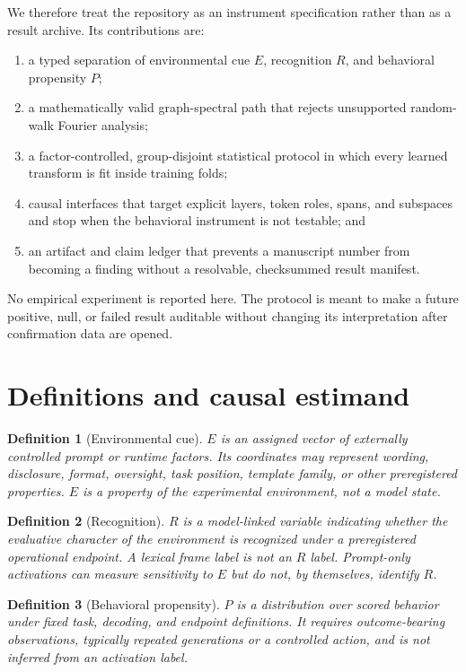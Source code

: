 \documentclass[10pt]{article}
\newtheorem{definition}{Definition}
\begin{document}
We therefore treat the repository as an instrument specification rather than as a result archive. Its contributions are:
\begin{enumerate}[leftmargin=1.4em]
    \item a typed separation of environmental cue $E$, recognition $R$, and behavioral propensity $P$;
    \item a mathematically valid graph-spectral path that rejects unsupported random-walk Fourier analysis;
    \item a factor-controlled, group-disjoint statistical protocol in which every learned transform is fit inside training folds;
    \item causal interfaces that target explicit layers, token roles, spans, and subspaces and stop when the behavioral instrument is not testable; and
    \item an artifact and claim ledger that prevents a manuscript number from becoming a finding without a resolvable, checksummed result manifest.
\end{enumerate}

No empirical experiment is reported here. The protocol is meant to make a future positive, null, or failed result auditable without changing its interpretation after confirmation data are opened.

\section{Definitions and causal estimand}

\begin{definition}[Environmental cue]
$E$ is an assigned vector of externally controlled prompt or runtime factors. Its coordinates may represent wording, disclosure, format, oversight, task position, template family, or other preregistered properties. $E$ is a property of the experimental environment, not a model state.
\end{definition}

\begin{definition}[Recognition]
$R$ is a model-linked variable indicating whether the evaluative character of the environment is recognized under a preregistered operational endpoint. A lexical frame label is not an $R$ label. Prompt-only activations can measure sensitivity to $E$ but do not, by themselves, identify $R$.
\end{definition}

\begin{definition}[Behavioral propensity]
$P$ is a distribution over scored behavior under fixed task, decoding, and endpoint definitions. It requires outcome-bearing observations, typically repeated generations or a controlled action, and is not inferred from an activation label.
\end{definition}
\end{document}
